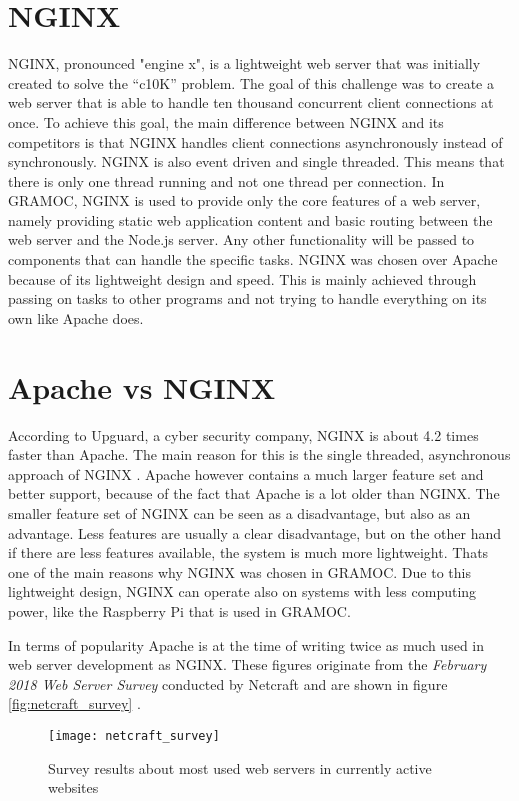 \section{NGINX}
NGINX, pronounced "engine x", is a lightweight web server that was initially created to solve the ``c10K'' problem. The goal of this challenge was to create a web server that is able to handle ten thousand concurrent client connections at once. To achieve this goal, the main difference between NGINX and its competitors is that NGINX handles client connections asynchronously instead of synchronously. NGINX is also event driven and single threaded. This means that there is only one thread running and not one thread per connection. In GRAMOC, NGINX is used to provide only the core features of a web server, namely providing static web application content and basic routing between the web server and the Node.js server. Any other functionality will be passed to components that can handle the specific tasks. NGINX was chosen over Apache because of its lightweight design and speed. This is mainly achieved through passing on tasks to other programs and not trying to handle everything on its own like Apache does.

\section{Apache vs NGINX}
According to Upguard, a cyber security company, NGINX is about 4.2 times faster than Apache. The main reason for this is the single threaded, asynchronous approach of NGINX \autocite{UpguardAvN}.
Apache however contains a much larger feature set and better support, because of the fact that Apache is a lot older than NGINX. The smaller feature set of NGINX can be seen as a disadvantage, but also as an advantage. Less features are usually a clear disadvantage, but on the other hand if there are less features available, the system is much more lightweight. Thats one of the main reasons why NGINX was chosen in GRAMOC. Due to this lightweight design, NGINX can operate also on systems with less computing power, like the Raspberry Pi that is used in GRAMOC.

In terms of popularity Apache is at the time of writing twice as much used in web server development as NGINX. These figures originate from the \textit{February 2018 Web Server Survey} conducted by Netcraft and are shown in figure \vref{fig:netcraft_survey} \autocite{netcraft_survey}.

\begin{figure}[h]
    \centering
    \texttt{[image: netcraft\_survey]}
    \caption{Survey results about most used web servers in currently active websites}
    \label{fig:netcraft_survey}
\end{figure}

